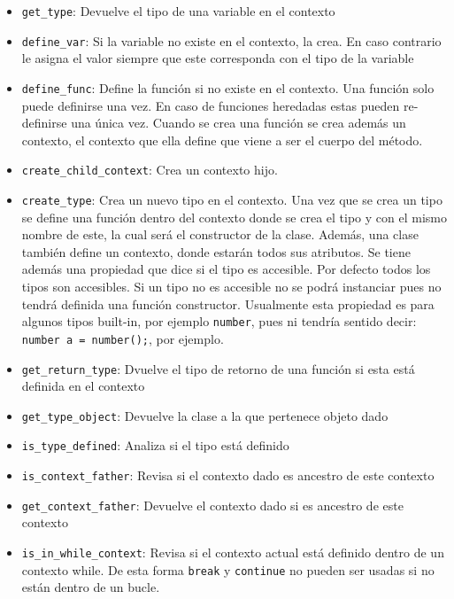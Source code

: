 \begin{itemize}
\begin{itemize}
	\item \verb|get_type|: Devuelve el tipo de una variable en el contexto
	
	\item \verb|define_var|: Si la variable no existe en el contexto, la crea. En caso contrario le asigna el valor siempre que este corresponda con el tipo de la variable
	
	\item \verb|define_func|: Define la funci\'on si no existe en el contexto. Una función solo puede definirse una vez. En caso de funciones heredadas estas pueden re-definirse una única vez. Cuando se crea una función se crea además un contexto, el contexto que ella define que viene a ser el cuerpo del método.
	
	\item \verb|create_child_context|: Crea un contexto hijo.
	
	\item \verb|create_type|: Crea un nuevo tipo en el contexto. Una vez que se crea un tipo se define una función dentro del contexto donde se crea el tipo y con el mismo nombre de este, la cual será el constructor de la clase. Además, una clase también define un contexto, donde estarán todos sus atributos. Se tiene además una propiedad que dice si el tipo es accesible. Por defecto todos los tipos son accesibles. Si un tipo no es accesible no se podrá instanciar pues no tendrá definida una función constructor. Usualmente esta propiedad es para algunos tipos built-in, por ejemplo \verb|number|, pues ni tendría sentido decir: \verb|number a = number();|, por ejemplo.
	
	\item \verb|get_return_type|: Dvuelve el tipo de retorno de una funci\'on si esta est\'a definida en el contexto
	
	\item \verb|get_type_object|: Devuelve la clase a la que pertenece objeto dado 
	
	\item \verb|is_type_defined|: Analiza si el tipo est\'a definido
	
	\item \verb|is_context_father|: Revisa si el contexto dado es ancestro de este contexto
	
	\item \verb|get_context_father|: Devuelve el contexto dado si es ancestro de este contexto
	
	\item \verb|is_in_while_context|: Revisa si el contexto actual está definido dentro de un contexto while. De esta forma \verb|break| y \verb|continue| no pueden ser usadas si no están dentro de un bucle.
	

\end{itemize}
\end{itemize}
